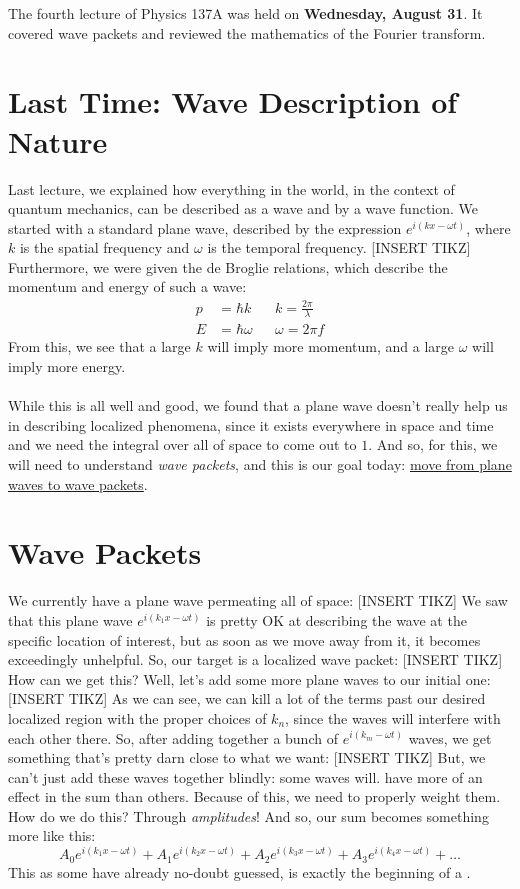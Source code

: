 The fourth lecture of Physics 137A was held on \textbf{Wednesday, August 31}. It covered wave packets and reviewed the mathematics of the Fourier transform.
\section{Last Time: Wave Description of Nature}
    Last lecture, we explained how everything in the world, in the context of quantum mechanics, can be described as a wave and by a wave function. We started with a standard plane wave, described by the expression $e^{i(kx - \omega t)}$, where $k$ is the spatial frequency and $\omega$ is the temporal frequency. [INSERT TIKZ] Furthermore, we were given the de Broglie relations, which describe the momentum and energy of such a wave:
    \begin{align*}
        p &= \hbar k &&k = \frac{2\pi}{\lambda}\\
        E &= \hbar\omega &&\omega = 2\pi f
    \end{align*}
    From this, we see that a large $k$ will imply more momentum, and a large $\omega$ will imply more energy.\\\\
    While this is all well and good, we found that a plane wave doesn't really help us in describing localized phenomena, since it exists everywhere in space and time and we need the integral over all of space to come out to $1$. And so, for this, we will need to understand \textit{wave packets}, and this is our goal today: \underline{move from plane waves to wave packets}.

\section{Wave Packets}
    We currently have a plane wave permeating all of space: [INSERT TIKZ]
    We saw that this plane wave $e^{i(k_1x - \omega t)}$ is pretty OK at describing the wave at the specific location of interest, but as soon as we move away from it, it becomes exceedingly unhelpful. So, our target is a localized wave packet:
    [INSERT TIKZ]
    How can we get this? Well, let's add some more plane waves to our initial one:
    [INSERT TIKZ]
    As we can see, we can kill a lot of the terms past our desired localized region with the proper choices of $k_n$, since the waves will interfere with each other there. So, after adding together a bunch of $e^{i(k_m - \omega t)}$ waves, we get something that's pretty darn close to what we want:
    [INSERT TIKZ]
    But, we can't just add these waves together blindly: some waves will. have more of an effect in the sum than others. Because of this, we need to properly weight them. How do we do this? Through \textit{amplitudes}! And so, our sum becomes something more like this:
    $$A_0e^{i(k_1x - \omega t)} + A_1e^{i(k_2x - \omega t)} + A_2e^{i(k_3x - \omega t)} + A_3e^{i(k_4x - \omega t)} + \dots$$
    This as some have already no-doubt guessed, is exactly the beginning of a .

